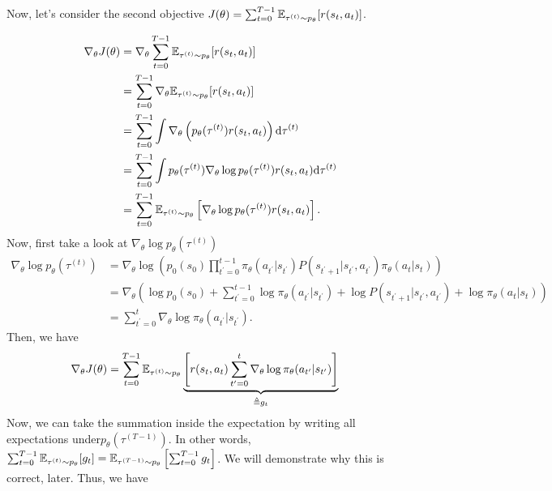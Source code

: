 \documentclass{article}
\begin{document}
Now, let's consider the second objective $J(\theta) = \sum_{t=0}^{T-1} \BBE_{\tau^{(t)} \sim p_\theta}[r(s_t, a_t)]$.
\begin{tcolorbox}[breakable,enhanced,colback=gray!10!white,colframe=gray!50!black,
title={Policy Gradient Derivation for $J(\theta) = \sum_{t=0}^{T-1} \BBE_{\tau^{(t)} \sim p_\theta}[r(s_t, a_t)]$}]

\begin{align*}
\nabla_\theta J(\theta) &= \nabla_\theta \sum_{t=0}^{T-1} {\mathbb E}_{\tau^{(t)} \sim p_\theta}[r(s_t, a_t)] \\
&= \sum_{t=0}^{T-1} \nabla_\theta {\mathbb E}_{\tau^{(t)} \sim p_\theta}[r(s_t, a_t)] \\
&= \sum_{t=0}^{T-1} \int \nabla_\theta \left(p_\theta(\tau^{(t)}) r(s_t, a_t)\right) {\rm d}\tau^{(t)} \\
&= \sum_{t=0}^{T-1} \int p_\theta(\tau^{(t)}) \nabla_\theta \log p_\theta(\tau^{(t)}) r(s_t, a_t) {\rm d}\tau^{(t)} \\
&= \sum_{t=0}^{T-1} {\mathbb E}_{\tau^{(t)} \sim p_\theta} \left[\nabla_\theta \log p_\theta(\tau^{(t)}) r(s_t, a_t)\right].
\end{align*}
Now, first take a look at $\nabla_\theta \log p_\theta(\tau^{(t)})$
\begin{align*}
\nabla_\theta \log p_\theta(\tau^{(t)}) &= \nabla_\theta \log \left( p_0(s_0)\prod_{t^\prime = 0}^{t-1} \pi_\theta(a_{t^\prime}|s_{t^\prime})P(s_{t^\prime+1}|s_{t^\prime}, a_{t^\prime}) \pi_\theta(a_t|s_t)\right)\\
&= \nabla_\theta \left(\log p_0(s_0)+\sum_{t^\prime = 0}^{t-1} \log \pi_\theta(a_{t^\prime}|s_{t^\prime}) + \log P(s_{t^\prime+1}|s_{t^\prime}, a_{t^\prime}) + \log \pi_\theta(a_t|s_t)\right)\\
&= \sum_{t^\prime = 0}^{t} \nabla_\theta \log \pi_\theta(a_{t^\prime}|s_{t^\prime}).
\end{align*}
Then, we have
\begin{align*}
    \nabla_\theta J(\theta) &= \sum_{t=0}^{T-1} {\mathbb E}_{\tau^{(t)} \sim p_\theta}  \underbrace{\left[r(s_t, a_t)\sum_{t^\prime = 0}^{t} \nabla_\theta \log \pi_\theta(a_{t^\prime}|s_{t^\prime})\right]}_{\triangleq g_t}
\end{align*}
Now, we can take the summation inside the expectation by writing all expectations under$p_\theta(\tau^{(T-1)})$. In other words, $\sum_{t=0}^{T-1} {\mathbb E}_{\tau^{(t)} \sim p_\theta}[g_t] = {\mathbb E}_{\tau^{(T-1)} \sim p_\theta}\left[\sum_{t=0}^{T-1} g_t\right]$. We will demonstrate why this is correct, later. Thus, we have


\end{tcolorbox}
\end{document}
